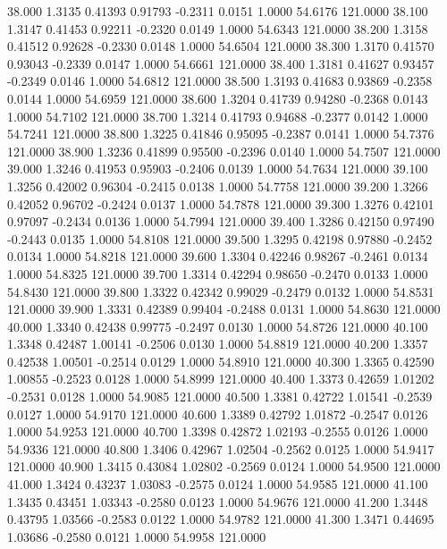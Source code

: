   38.000   1.3135   0.41393   0.91793  -0.2311   0.0151   1.0000  54.6176 121.0000
  38.100   1.3147   0.41453   0.92211  -0.2320   0.0149   1.0000  54.6343 121.0000
  38.200   1.3158   0.41512   0.92628  -0.2330   0.0148   1.0000  54.6504 121.0000
  38.300   1.3170   0.41570   0.93043  -0.2339   0.0147   1.0000  54.6661 121.0000
  38.400   1.3181   0.41627   0.93457  -0.2349   0.0146   1.0000  54.6812 121.0000
  38.500   1.3193   0.41683   0.93869  -0.2358   0.0144   1.0000  54.6959 121.0000
  38.600   1.3204   0.41739   0.94280  -0.2368   0.0143   1.0000  54.7102 121.0000
  38.700   1.3214   0.41793   0.94688  -0.2377   0.0142   1.0000  54.7241 121.0000
  38.800   1.3225   0.41846   0.95095  -0.2387   0.0141   1.0000  54.7376 121.0000
  38.900   1.3236   0.41899   0.95500  -0.2396   0.0140   1.0000  54.7507 121.0000
  39.000   1.3246   0.41953   0.95903  -0.2406   0.0139   1.0000  54.7634 121.0000
  39.100   1.3256   0.42002   0.96304  -0.2415   0.0138   1.0000  54.7758 121.0000
  39.200   1.3266   0.42052   0.96702  -0.2424   0.0137   1.0000  54.7878 121.0000
  39.300   1.3276   0.42101   0.97097  -0.2434   0.0136   1.0000  54.7994 121.0000
  39.400   1.3286   0.42150   0.97490  -0.2443   0.0135   1.0000  54.8108 121.0000
  39.500   1.3295   0.42198   0.97880  -0.2452   0.0134   1.0000  54.8218 121.0000
  39.600   1.3304   0.42246   0.98267  -0.2461   0.0134   1.0000  54.8325 121.0000
  39.700   1.3314   0.42294   0.98650  -0.2470   0.0133   1.0000  54.8430 121.0000
  39.800   1.3322   0.42342   0.99029  -0.2479   0.0132   1.0000  54.8531 121.0000
  39.900   1.3331   0.42389   0.99404  -0.2488   0.0131   1.0000  54.8630 121.0000
  40.000   1.3340   0.42438   0.99775  -0.2497   0.0130   1.0000  54.8726 121.0000
  40.100   1.3348   0.42487   1.00141  -0.2506   0.0130   1.0000  54.8819 121.0000
  40.200   1.3357   0.42538   1.00501  -0.2514   0.0129   1.0000  54.8910 121.0000
  40.300   1.3365   0.42590   1.00855  -0.2523   0.0128   1.0000  54.8999 121.0000
  40.400   1.3373   0.42659   1.01202  -0.2531   0.0128   1.0000  54.9085 121.0000
  40.500   1.3381   0.42722   1.01541  -0.2539   0.0127   1.0000  54.9170 121.0000
  40.600   1.3389   0.42792   1.01872  -0.2547   0.0126   1.0000  54.9253 121.0000
  40.700   1.3398   0.42872   1.02193  -0.2555   0.0126   1.0000  54.9336 121.0000
  40.800   1.3406   0.42967   1.02504  -0.2562   0.0125   1.0000  54.9417 121.0000
  40.900   1.3415   0.43084   1.02802  -0.2569   0.0124   1.0000  54.9500 121.0000
  41.000   1.3424   0.43237   1.03083  -0.2575   0.0124   1.0000  54.9585 121.0000
  41.100   1.3435   0.43451   1.03343  -0.2580   0.0123   1.0000  54.9676 121.0000
  41.200   1.3448   0.43795   1.03566  -0.2583   0.0122   1.0000  54.9782 121.0000
  41.300   1.3471   0.44695   1.03686  -0.2580   0.0121   1.0000  54.9958 121.0000
